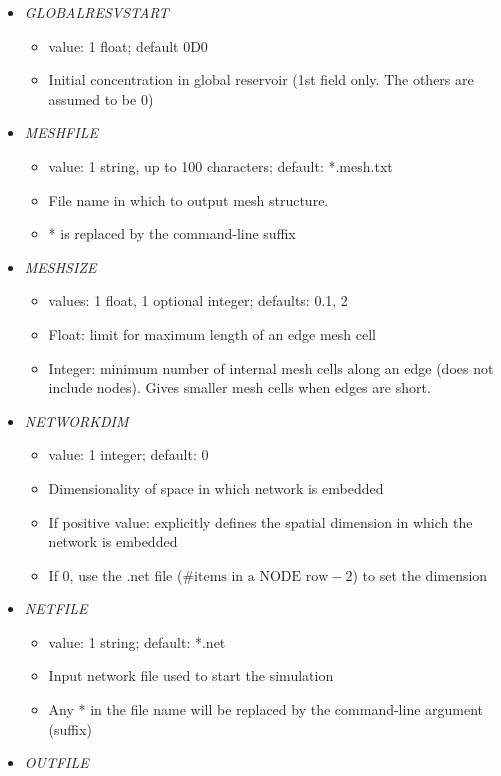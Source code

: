 \documentclass[12pt]{article}
\begin{document}
\begin{itemize}
%
\item {\it GLOBALRESVSTART}
\begin{itemize}
	\item  value: 1 float; default 0D0
	\item Initial concentration in global reservoir (1st field only. The others are assumed to be 0)
\end{itemize}
%
\item {\it MESHFILE}
\begin{itemize}
	\item  value: 1 string, up to 100 characters; default: *.mesh.txt
	\item File name in which to output mesh structure.
	\item * is replaced by the command-line suffix
\end{itemize}
%
\item {\it MESHSIZE}
\begin{itemize}
	\item  values: 1 float, 1 optional integer; defaults: 0.1, 2
	\item Float: limit for maximum length of an edge mesh cell
	\item Integer: minimum number of internal mesh cells along an edge (does not include nodes). Gives smaller mesh cells when edges are short.
\end{itemize}
%
\item {\it NETWORKDIM}
	\begin{itemize}
		\item  value: 1 integer; default: 0
		\item Dimensionality of space in which network is embedded
		\item If positive value: explicitly defines the spatial dimension in which the network is embedded
		\item If 0, use the .net file ($\text{\# items in a NODE row} - 2$) to set the dimension
	\end{itemize}
%
\item {\it NETFILE}
\begin{itemize}
	\item  value: 1 string; default: *.net
	\item Input network file used to start the simulation
	 \item Any * in the file name will be replaced by the command-line argument (suffix)
\end{itemize}
%
\item {\it OUTFILE}
    \begin{itemize}

\end{itemize}
\end{itemize}
\end{document}
